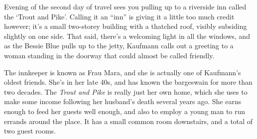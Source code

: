\begin{callout}
Evening of the second day of travel sees you pulling up to a riverside inn
called the `Trout and Pike'. Calling it an ``inn'' is giving it a little too much
credit however; it's a small two-storey building with a thatched roof, visibly
subsiding slightly on one side. That said, there's a welcoming light in all the
windows, and as the Bessie Blue pulls up to the jetty, Kaufmann calls
out a greeting to a woman standing in the doorway that could almost be called
friendly.
\end{callout}

The innkeeper is known as Frau Mara, and she is actually one of Kaufmann's
oldest friends. She's in her late 40s, and has known the bargeswain for more
than two decades. The \textit{Trout and Pike} is really just her own home,
which she uses to make some income following her husband's death several years
ago. She earns enough to feed her guests well enough, and also to employ a
young man to run errands around the place. It has a small common room downstairs,
and a total of two guest rooms.
